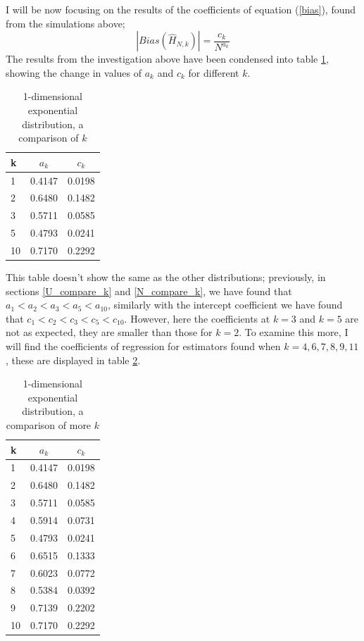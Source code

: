 \documentclass{report}
\begin{document}
I will be now focusing on the results of the coefficients of equation (\ref{bias}), found from the simulations above;
\begin{equation}
|Bias(\hat{H}_{N, k})| = \frac{c_{k}}{N^{a_{k}}} \nonumber
\end{equation}
The results from the investigation above have been condensed into table \ref{expo_k_comparison_table}, showing the change in values of $a_{k}$ and $c_{k}$ for different $k$.

\begin{table}
\caption{1-dimensional exponential distribution, a comparison of $k$} \label{expo_k_comparison_table}
\begin{center}
\begin{tabular}{| l | c c|} 
\toprule
k & $a_{k}$ & $c_{k}$ \\
\midrule[1pt]
1 &  0.4147  &  0.0198  \\
2 &  0.6480  &  0.1482  \\
3 &  0.5711  &  0.0585  \\
5 &  0.4793  &  0.0241  \\
10 & 0.7170 &  0.2292 \\
\hline
\end{tabular}
\end{center}
\end{table}

This table doesn't show the same as the other distributions; previously, in sections \ref{U_compare_k} and \ref{N_compare_k}, we have found that $a_{1} < a_{2} < a_{3} < a_{5} < a_{10}$, similarly with the intercept coefficient we have found that $c_{1} < c_{2} < c_{3} < c_{5} < c_{10}$. However, here the coefficients at $k=3$ and $k=5$ are not as expected, they are smaller than those for $k=2$. To examine this more, I will find the coefficients of regression for estimators found when $k=4,6,7,8,9,11$, these are displayed in table \ref{expo_more_coeffs}.

\begin{table}
\caption{1-dimensional exponential distribution, a comparison of more $k$} \label{expo_more_coeffs}
\begin{center}
\begin{tabular}{| l | c c|} 
\toprule
k & $a_{k}$ & $c_{k}$ \\
\midrule[1pt]
1 &  0.4147  &  0.0198  \\
2 &  0.6480  &  0.1482  \\
3 &  0.5711  &  0.0585  \\
4 &  0.5914  &  0.0731 \\
5 &  0.4793  &  0.0241  \\
6 &  0.6515  &  0.1333  \\
7 &  0.6023  &  0.0772  \\
8 &  0.5384  &  0.0392  \\
9 &  0.7139  &  0.2202  \\
10 & 0.7170 &  0.2292 \\
\hline
\end{tabular}
\end{center}
\end{table}
\end{document}
